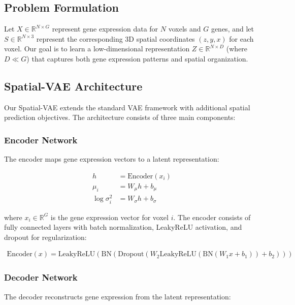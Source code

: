 \documentclass[11pt]{article}
\begin{document}
\subsection{Problem Formulation}

Let $X \in \mathbb{R}^{N \times G}$ represent gene expression data for $N$ voxels and $G$ genes, and let $S \in \mathbb{R}^{N \times 3}$ represent the corresponding 3D spatial coordinates $(z, y, x)$ for each voxel. Our goal is to learn a low-dimensional representation $Z \in \mathbb{R}^{N \times D}$ (where $D \ll G$) that captures both gene expression patterns and spatial organization.

\subsection{Spatial-VAE Architecture}

Our Spatial-VAE extends the standard VAE framework with additional spatial prediction objectives. The architecture consists of three main components:

\subsubsection{Encoder Network}

The encoder maps gene expression vectors to a latent representation:

\begin{align}
h &= \text{Encoder}(x_i) \\
\mu_i &= W_\mu h + b_\mu \\
\log\sigma^2_i &= W_\sigma h + b_\sigma
\end{align}

where $x_i \in \mathbb{R}^G$ is the gene expression vector for voxel $i$. The encoder consists of fully connected layers with batch normalization, LeakyReLU activation, and dropout for regularization:

\begin{align}
\text{Encoder}(x) = \text{LeakyReLU}(\text{BN}(\text{Dropout}(W_2 \text{LeakyReLU}(\text{BN}(W_1 x + b_1)) + b_2)))
\end{align}

\subsubsection{Decoder Network}

The decoder reconstructs gene expression from the latent representation:
\end{document}
